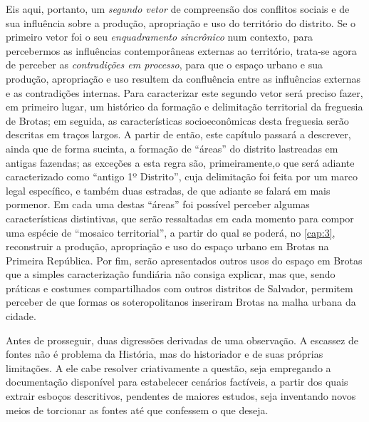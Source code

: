 Eis aqui, portanto, um \textit{segundo vetor} de compreensão dos conflitos sociais e de sua influência sobre a produção, apropriação e uso do território do distrito. Se o primeiro vetor foi o seu \textit{enquadramento sincrônico} num contexto, para percebermos as influências contemporâneas externas ao território, trata-se agora de perceber as \textit{contradições em processo}, para que o espaço urbano e sua produção, apropriação e uso resultem da confluência entre as influências externas e as contradições internas. Para caracterizar este segundo vetor será preciso fazer, em primeiro lugar, um histórico da formação e delimitação territorial da freguesia de Brotas; em seguida, as características socioeconômicas desta freguesia serão descritas em traços largos. A partir de então, este capítulo passará a descrever, ainda que de forma sucinta, a formação de ``áreas'' do distrito lastreadas em antigas fazendas; as exceções a esta regra são, primeiramente,o que será adiante caracterizado como ``antigo 1º Distrito'', cuja delimitação foi feita por um marco legal específico, e também duas estradas, de que adiante se falará em mais pormenor. Em cada uma destas ``áreas'' foi possível perceber algumas características distintivas, que serão ressaltadas em cada momento para compor uma espécie de ``mosaico territorial'', a partir do qual se poderá, no \autoref{cap:3}, reconstruir a produção, apropriação e uso do espaço urbano em Brotas na Primeira República. Por fim, serão apresentados outros usos do espaço em Brotas que a simples caracterização fundiária não consiga explicar, mas que, sendo práticas e costumes compartilhados com outros distritos de Salvador, permitem perceber de que formas os soteropolitanos inseriram Brotas na malha urbana da cidade.

Antes de prosseguir, duas digressões derivadas de uma observação. A escassez de fontes não é problema da História, mas do historiador e de suas próprias limitações. A ele cabe resolver criativamente a questão, seja empregando a documentação disponível para estabelecer cenários factíveis, a partir dos quais extrair esboços descritivos, pendentes de maiores estudos, seja inventando novos meios de torcionar as fontes até que confessem o que deseja.

